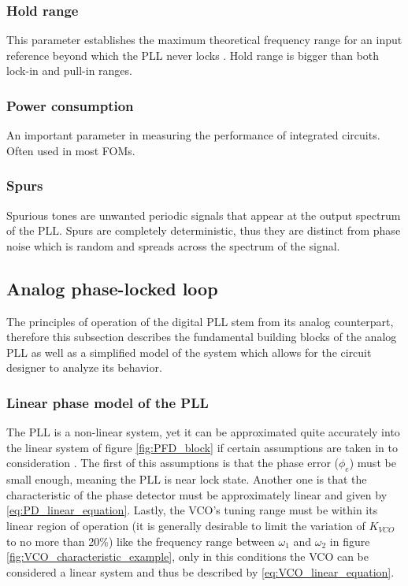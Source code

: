 \subsubsection{Hold range}
This parameter establishes the maximum theoretical frequency range for an input reference beyond which the PLL never locks \cite{Leonov2015}. Hold range
is bigger than both lock-in and pull-in ranges.

\subsubsection{Power consumption}
An important parameter in measuring the performance of integrated circuits. Often used in most FOMs.
\subsubsection{Spurs}
Spurious tones are unwanted periodic signals that appear at the output spectrum of the PLL. Spurs are completely deterministic, thus they are distinct
from phase noise which is random and spreads across the spectrum of the signal.

\subsection{Analog phase-locked loop}
The principles of operation of the digital PLL stem from its analog counterpart, therefore this subsection describes the fundamental 
building blocks of the analog PLL as well as a simplified model of the system which allows for the circuit designer to analyze its behavior.

\subsubsection{Linear phase model of the PLL}
The PLL is a non-linear system, yet it can be approximated quite accurately into the linear system of figure \ref{fig:PFD_block} if certain
assumptions are taken in to consideration \cite{Wolaver1991}. The first of this assumptions is that the phase error ($\phi_{e}$) must be small enough, 
meaning the PLL is near lock state. Another one is that the characteristic of the phase detector must be approximately linear and given
by \eqref{eq:PD_linear_equation}. Lastly, the VCO's tuning range must be within its linear region of operation (it is generally desirable to limit the
variation of $K_{VCO}$ to no more than 20\%) like the frequency range between $\omega_1$ and $\omega_2$ in figure \ref{fig:VCO_characteristic_example}, only in this conditions the VCO can be considered
a linear system and thus be described by \eqref{eq:VCO_linear_equation}.  

